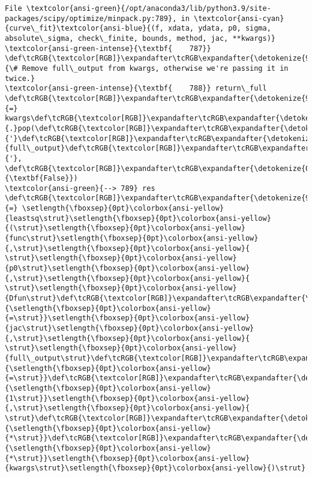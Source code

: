 \documentclass[11pt]{article}
\begin{document}
\begin{Verbatim}[commandchars=\\\{\}, frame=single, framerule=2mm, rulecolor=\color{outerrorbackground}]
File \textcolor{ansi-green}{/opt/anaconda3/lib/python3.9/site-packages/scipy/optimize/minpack.py:789}, in \textcolor{ansi-cyan}{curve\_fit}\textcolor{ansi-blue}{(f, xdata, ydata, p0, sigma, absolute\_sigma, check\_finite, bounds, method, jac, **kwargs)}
\textcolor{ansi-green-intense}{\textbf{    787}} \def\tcRGB{\textcolor[RGB]}\expandafter\tcRGB\expandafter{\detokenize{95,135,135}}{\# Remove full\_output from kwargs, otherwise we're passing it in twice.}
\textcolor{ansi-green-intense}{\textbf{    788}} return\_full \def\tcRGB{\textcolor[RGB]}\expandafter\tcRGB\expandafter{\detokenize{98,98,98}}{=} kwargs\def\tcRGB{\textcolor[RGB]}\expandafter\tcRGB\expandafter{\detokenize{98,98,98}}{.}pop(\def\tcRGB{\textcolor[RGB]}\expandafter\tcRGB\expandafter{\detokenize{175,0,0}}{'}\def\tcRGB{\textcolor[RGB]}\expandafter\tcRGB\expandafter{\detokenize{175,0,0}}{full\_output}\def\tcRGB{\textcolor[RGB]}\expandafter\tcRGB\expandafter{\detokenize{175,0,0}}{'}, \def\tcRGB{\textcolor[RGB]}\expandafter\tcRGB\expandafter{\detokenize{0,135,0}}{\textbf{False}})
\textcolor{ansi-green}{--> 789} res \def\tcRGB{\textcolor[RGB]}\expandafter\tcRGB\expandafter{\detokenize{98,98,98}}{=} \setlength{\fboxsep}{0pt}\colorbox{ansi-yellow}{leastsq\strut}\setlength{\fboxsep}{0pt}\colorbox{ansi-yellow}{(\strut}\setlength{\fboxsep}{0pt}\colorbox{ansi-yellow}{func\strut}\setlength{\fboxsep}{0pt}\colorbox{ansi-yellow}{,\strut}\setlength{\fboxsep}{0pt}\colorbox{ansi-yellow}{ \strut}\setlength{\fboxsep}{0pt}\colorbox{ansi-yellow}{p0\strut}\setlength{\fboxsep}{0pt}\colorbox{ansi-yellow}{,\strut}\setlength{\fboxsep}{0pt}\colorbox{ansi-yellow}{ \strut}\setlength{\fboxsep}{0pt}\colorbox{ansi-yellow}{Dfun\strut}\def\tcRGB{\textcolor[RGB]}\expandafter\tcRGB\expandafter{\detokenize{98,98,98}}{\setlength{\fboxsep}{0pt}\colorbox{ansi-yellow}{=\strut}}\setlength{\fboxsep}{0pt}\colorbox{ansi-yellow}{jac\strut}\setlength{\fboxsep}{0pt}\colorbox{ansi-yellow}{,\strut}\setlength{\fboxsep}{0pt}\colorbox{ansi-yellow}{ \strut}\setlength{\fboxsep}{0pt}\colorbox{ansi-yellow}{full\_output\strut}\def\tcRGB{\textcolor[RGB]}\expandafter\tcRGB\expandafter{\detokenize{98,98,98}}{\setlength{\fboxsep}{0pt}\colorbox{ansi-yellow}{=\strut}}\def\tcRGB{\textcolor[RGB]}\expandafter\tcRGB\expandafter{\detokenize{98,98,98}}{\setlength{\fboxsep}{0pt}\colorbox{ansi-yellow}{1\strut}}\setlength{\fboxsep}{0pt}\colorbox{ansi-yellow}{,\strut}\setlength{\fboxsep}{0pt}\colorbox{ansi-yellow}{ \strut}\def\tcRGB{\textcolor[RGB]}\expandafter\tcRGB\expandafter{\detokenize{98,98,98}}{\setlength{\fboxsep}{0pt}\colorbox{ansi-yellow}{*\strut}}\def\tcRGB{\textcolor[RGB]}\expandafter\tcRGB\expandafter{\detokenize{98,98,98}}{\setlength{\fboxsep}{0pt}\colorbox{ansi-yellow}{*\strut}}\setlength{\fboxsep}{0pt}\colorbox{ansi-yellow}{kwargs\strut}\setlength{\fboxsep}{0pt}\colorbox{ansi-yellow}{)\strut}

\end{Verbatim}
\end{document}

